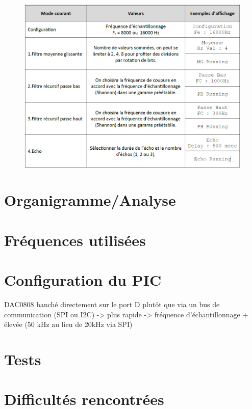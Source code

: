 \documentclass{article}
\begin{document}
    
    \begin{figure}[H]
        \centering
        \includegraphics[width=.7\textwidth]{./images/menus.png}
    \end{figure}


    \section{Organigramme/Analyse}

    \section{Fréquences utilisées}

    \section{Configuration du PIC}
    DAC0808 banché directement sur le port D plutôt que via un bus de communication (SPI ou I2C) -> plus rapide -> fréquence d'échantillonnage + élevée (50 kHz au lieu de 20kHz via SPI)

    \section{Tests}

    \section{Difficultés rencontrées}

    
\end{document}
